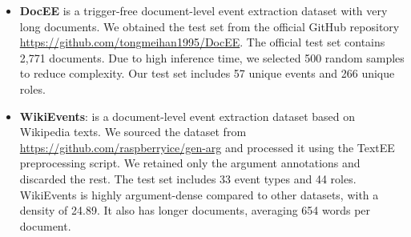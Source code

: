 \begin{itemize}
\item \textbf{DocEE} \cite{tong-etal-2022-docee} is a trigger-free document-level event extraction dataset with very long documents. We obtained the test set from the official GitHub repository \href{https://github.com/tongmeihan1995/DocEE}{https://github.com/tongmeihan1995/DocEE}. The official test set contains 2,771 documents. Due to high inference time, we selected 500 random samples to reduce complexity. Our test set includes 57 unique events and 266 unique roles.


\item \textbf{WikiEvents}: \cite{li-etal-2021-document} is a document-level event extraction dataset based on Wikipedia texts. We sourced the dataset from \href{https://github.com/raspberryice/gen-arg}{https://github.com/raspberryice/gen-arg} and processed it using the TextEE \cite{huang-etal-2024-textee} preprocessing script. We retained only the argument annotations and discarded the rest. The test set includes 33 event types and 44 roles. WikiEvents is highly argument-dense compared to other datasets, with a density of 24.89. It also has longer documents, averaging 654 words per document.

\end{itemize}

